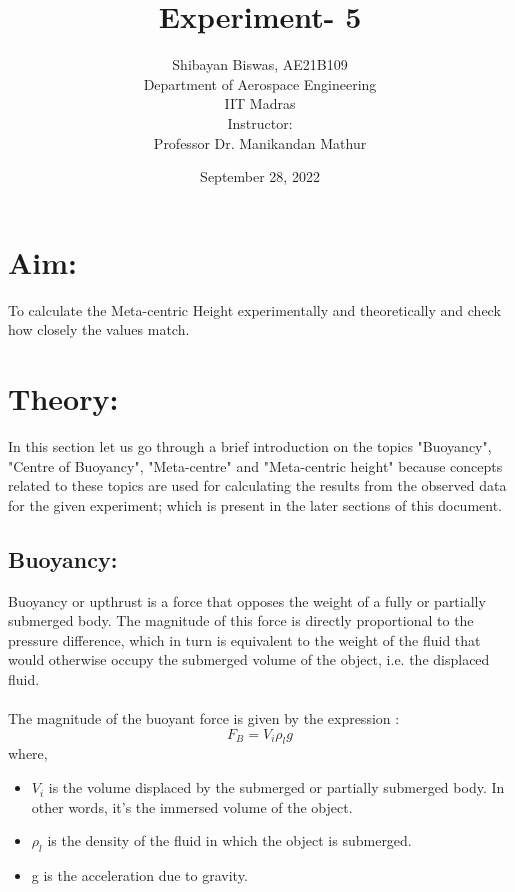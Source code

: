\documentclass[12pt,a4paper]{article}
\author{ Shibayan Biswas, AE21B109\\ Department of Aerospace Engineering\\ IIT Madras\\[3ex] Instructor:\\ \large Professor Dr. Manikandan Mathur}
\title{Experiment- 5}
\date{September 28, 2022}
\begin{document}
\maketitle
\hline
\section{Aim:}
To calculate the Meta-centric Height experimentally and theoretically and check how closely the values match.
\section{Theory:}
In this section let us go through a brief introduction on the topics "Buoyancy", "Centre of Buoyancy", "Meta-centre" and "Meta-centric height" because concepts related to these topics are used for calculating the results from the observed data for the given experiment; which is present in the later sections of this document. 
\subsection{Buoyancy:}
Buoyancy or upthrust is a force that opposes the weight of a fully or partially submerged body. The magnitude of this force is directly proportional to the pressure difference, which in turn is equivalent to the weight of the fluid that would otherwise occupy the submerged volume of the object, i.e. the displaced fluid.\\
\\The magnitude of the buoyant force is given by the expression :
\begin{equation}
\text{$F_B$} = \text{$V_i \rho_l g$}
\end{equation}
where,
\begin{itemize}
\item $V_i$ is the volume displaced by the submerged or partially submerged body. In other words, it’s the immersed volume of the object.
\item $\rho_l$ is the density of the fluid in which the object is submerged.
\item g is the acceleration due to gravity.
\end{itemize}
\end{document}
